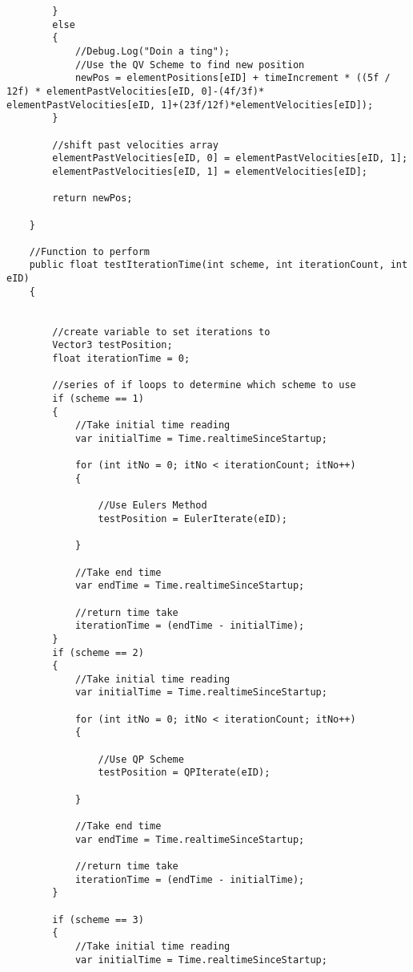 \begin{mdframed}[linecolor=black, topline=true, bottomline=true,
  leftline=false, rightline=false]
\begin{verbatim}
        }
        else
        {
            //Debug.Log("Doin a ting");
            //Use the QV Scheme to find new position
            newPos = elementPositions[eID] + timeIncrement * ((5f / 12f) * elementPastVelocities[eID, 0]-(4f/3f)* elementPastVelocities[eID, 1]+(23f/12f)*elementVelocities[eID]);
        }

        //shift past velocities array
        elementPastVelocities[eID, 0] = elementPastVelocities[eID, 1];
        elementPastVelocities[eID, 1] = elementVelocities[eID];

        return newPos;
  
    }

    //Function to perform
    public float testIterationTime(int scheme, int iterationCount, int eID)
    {


        //create variable to set iterations to
        Vector3 testPosition;
        float iterationTime = 0;

        //series of if loops to determine which scheme to use
        if (scheme == 1)
        {
            //Take initial time reading
            var initialTime = Time.realtimeSinceStartup;

            for (int itNo = 0; itNo < iterationCount; itNo++)
            {

                //Use Eulers Method
                testPosition = EulerIterate(eID);

            }

            //Take end time
            var endTime = Time.realtimeSinceStartup;

            //return time take
            iterationTime = (endTime - initialTime);
        }
        if (scheme == 2)
        {
            //Take initial time reading
            var initialTime = Time.realtimeSinceStartup;

            for (int itNo = 0; itNo < iterationCount; itNo++)
            {

                //Use QP Scheme
                testPosition = QPIterate(eID);

            }

            //Take end time
            var endTime = Time.realtimeSinceStartup;

            //return time take
            iterationTime = (endTime - initialTime);
        }

        if (scheme == 3)
        {
            //Take initial time reading
            var initialTime = Time.realtimeSinceStartup;


\end{verbatim}
\end{mdframed}
